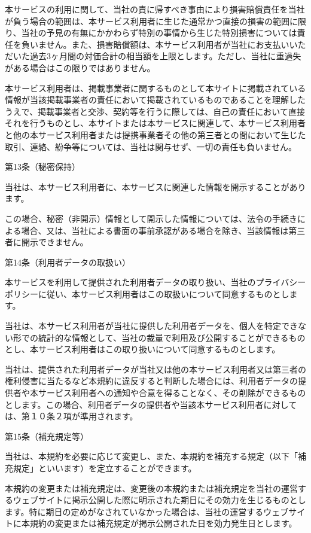     本サービスの利用に関して、当社の責に帰すべき事由により損害賠償責任を当社が負う場合の範囲は、本サービス利用者に生じた通常かつ直接の損害の範囲に限り、当社の予見の有無にかかわらず特別の事情から生じた特別損害については責任を負いません。また、損害賠償額は、本サービス利用者が当社にお支払いいただいた過去3ヶ月間の対価合計の相当額を上限とします。ただし、当社に重過失がある場合はこの限りではありません。

    本サービス利用者は、掲載事業者に関するものとして本サイトに掲載されている情報が当該掲載事業者の責任において掲載されているものであることを理解したうえで、掲載事業者と交渉、契約等を行うに際しては、自己の責任において直接それを行うものとし、本サイトまたは本サービスに関連して、本サービス利用者と他の本サービス利用者または提携事業者その他の第三者との間において生じた取引、連絡、紛争等については、当社は関与せず、一切の責任も負いません。

第13条（秘密保持）

    当社は、本サービス利用者に、本サービスに関連した情報を開示することがあります。

    この場合、秘密（非開示）情報として開示した情報については、法令の手続きによる場合、又は、当社による書面の事前承認がある場合を除き、当該情報は第三者に開示できません。

第14条（利用者データの取扱い）

    本サービスを利用して提供された利用者データの取り扱い、当社のプライバシーポリシーに従い、本サービス利用者はこの取扱いについて同意するものとします。

    当社は、本サービス利用者が当社に提供した利用者データを、個人を特定できない形での統計的な情報として、当社の裁量で利用及び公開することができるものとし、本サービス利用者はこの取り扱いについて同意するものとします。

    当社は、提供された利用者データが当社又は他の本サービス利用者又は第三者の権利侵害に当たるなど本規約に違反すると判断した場合には、利用者データの提供者や本サービス利用者への通知や合意を得ることなく、その削除ができるものとします。この場合、利用者データの提供者や当該本サービス利用者に対しては、第１０条２項が準用されます。

第15条（補充規定等）

    当社は、本規約を必要に応じて変更し、また、本規約を補充する規定（以下「補充規定」といいます）を定立することができます。

    本規約の変更または補充規定は、変更後の本規約または補充規定を当社の運営するウェブサイトに掲示公開した際に明示された期日にその効力を生じるものとします。特に期日の定めがなされていなかった場合は、当社の運営するウェブサイトに本規約の変更または補充規定が掲示公開された日を効力発生日とします。

